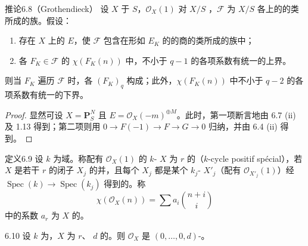 \begin{SGAresult}{推论}{6.8（Grothendieck）}
设 $X$ 于 $S$，$\mathscr O_X(1)$ 对 $X/S$ ，$\mathscr F$ 为 $X/S$ 各上的的类所成的族。假设：
\begin{enumerate}
\item[(a)] 存在 $X$ 上的 $E$，使 $\mathscr F$ 包含在形如 $E_K$ 的的商的类所成的族中；
\item[($\mathrm b_q$)] 各 $F_K\in\mathscr F$ 的 $\chi(F_K(n))$ 中，不小于 $q-1$ 的各项系数有统一的上界。
\end{enumerate}
则当 $F_K$ 遍历 $\mathscr F$ 时，各 $(F_K)_q$ 构成；此外，$\chi(F_K(n))$ 中不小于 $q-2$ 的各项系数有统一的下界。
\end{SGAresult}
\begin{proof}
显然可设 $X=\mathbf P^N_S$ 且 $E=\mathscr O_X(-m)^{\oplus M}$。此时，第一项断言地由 6.7 (ii) 及 1.13 得到；第二项则用 $0\to F(-1)\to F\to G\to0$ 归纳，并由 6.4 (ii) 得到。
\end{proof}
\begin{SGAresult}{定义}{6.9}
设 $k$ 为域。称配有 $\mathscr O_X(1)$ 的 $k$- $X$ 为 $r$ 的（$k$-cycle positif spécial），若 $X$ 是若干 $r$ 的闭子 $X_j$ 的并，且每个 $X_j$ 都是某个 $k_j$- $X'_j$（配有 $\mathscr O_{X'_j}(1)$）经 $\operatorname{Spec}(k)\to\operatorname{Spec}(k_j)$ 得到的。称
\[\chi(\mathscr O_X(n))=\sum a_i\binom{n+i}{i}\]
中的系数 $a_r$ 为 $X$ 的。
\end{SGAresult}
\begin{SGAresult}{}{6.10}
设 $k$ 为，$X$ 为 $r$、 $d$ 的。则 $\mathscr O_X$ 是 $(0,\ldots,0,d)$-。
\end{SGAresult}
